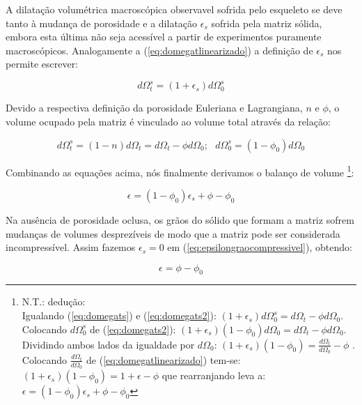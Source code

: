\documentclass[
	11pt, %
	fleqn, %
	a4paper, %
]{LegrandOrangeBook}
\begin{document}
A dilatação volumétrica macroscópica observavel sofrida pelo esqueleto se deve tanto à mudança de porosidade e a dilatação $\epsilon_s$ sofrida pela matriz sólida, embora esta última não seja acessível a partir de experimentos puramente macroscópicos. Analogamente a (\ref{eq:domegatlinearizado}) a definição de $\epsilon_s$ nos permite escrever:

\begin{equation}
	\label{eq:domegats}	
	d\Omega_t^s = (1+\epsilon_s)d\Omega_0^s
\end{equation}

Devido a respectiva definição da porosidade Euleriana e Lagrangiana, $n$ e $\phi$, o volume ocupado pela matriz é vinculado ao volume total através da relação:

\begin{equation}
	\label{eq:domegats2}	
	d\Omega_t^s = (1-n)d\Omega_t = d\Omega_t - \phi d\Omega_0; ~~~ d\Omega_0^s = (1-\phi_0)d\Omega_0
\end{equation}

Combinando as equações acima, nós finalmente derivamos o balanço de volume \footnote{N.T.: dedução: \\ Igualando (\ref{eq:domegats}) e (\ref{eq:domegats2}): $(1+\epsilon_s)d\Omega_0^s = d\Omega_t - \phi d\Omega_0$. \\ Colocando $d\Omega_0^s$ de (\ref{eq:domegats2}): $(1+\epsilon_s)(1-\phi_0)d\Omega_0 = d\Omega_t - \phi d\Omega_0$.\\ Dividindo ambos lados da igualdade por $d\Omega_0$: $(1+\epsilon_s)(1-\phi_0) = \frac{d\Omega_t}{d\Omega_0} - \phi$
. \\ Colocando $\frac{d\Omega_t}{d\Omega_0}$ de (\ref{eq:domegatlinearizado}) tem-se: $(1+\epsilon_s)(1-\phi_0) = 1+\epsilon - \phi$ que rearranjando leva a: $\epsilon = (1-\phi_0)\epsilon_s + \phi - \phi_0$
}:

\begin{equation}
	\label{eq:epsilongraocompressivel}	
	\epsilon = (1-\phi_0)\epsilon_s + \phi - \phi_0
\end{equation}

Na ausência de porosidade oclusa, os grãos do sólido que formam a matriz sofrem mudanças de volumes desprezíveis de modo que a matriz pode ser considerada incompressível. Assim fazemos $\epsilon_s = 0$ em (\ref{eq:epsilongraocompressivel}), obtendo:

\begin{equation}
	\label{eq:epsilon}	
	\epsilon = \phi - \phi_0
\end{equation}
\end{document}
